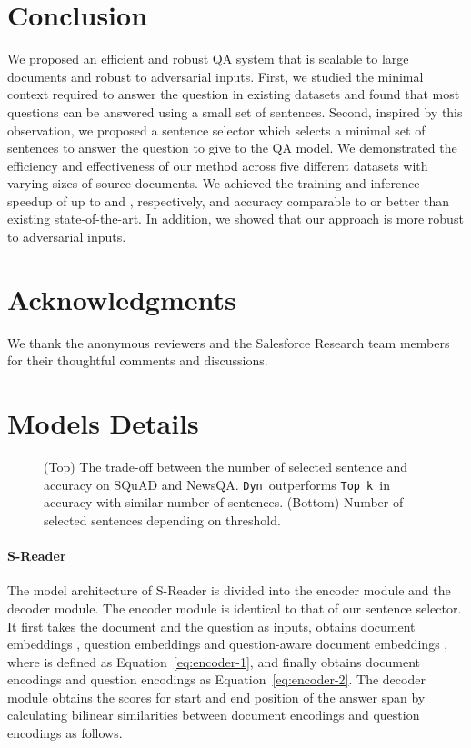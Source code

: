 \documentclass[11pt,a4paper]{article}
\newcommand{\topk}{{\tt Top k}}
\newcommand{\dyn}{{\tt Dyn}}
\begin{document}
 \section{Conclusion}\label{sec:concl}We proposed an efficient and robust QA system that is scalable to large documents and robust to adversarial inputs.
First, we studied the minimal context required to answer the question in existing datasets and found that most questions can be answered using a small set of sentences.
Second, inspired by this observation, we proposed a sentence selector which selects a minimal set of sentences to answer the question to give to the QA model.
We demonstrated the efficiency and effectiveness of our method across five different datasets with varying sizes of source documents.
We achieved the training and inference speedup of up to  and , respectively, and accuracy comparable to or better than existing state-of-the-art.
In addition, we showed that our approach is more robust to adversarial inputs. 
\section*{Acknowledgments}
We thank the anonymous reviewers and the Salesforce Research team members for their thoughtful comments and discussions.




\clearpage

\appendix
\section{Models Details}\label{sec:app-details}\begin{figure*}[pht]
\centering
{}
\caption{
(Top) The trade-off between the number of selected sentence and accuracy on SQuAD and NewsQA. \dyn~outperforms \topk~in accuracy with similar number of sentences. (Bottom) Number of selected sentences depending on threshold.
}
\label{fig:thresholding}
\end{figure*}

\paragraph{S-Reader}
The model architecture of S-Reader is divided into the encoder module and the decoder module. The encoder module is identical to that of our sentence selector. It first takes the document and the question as inputs, obtains document embeddings , question embeddings  and question-aware document embeddings , where  is defined as Equation~\ref{eq:encoder-1}, and finally obtains document encodings  and question encodings  as Equation~\ref{eq:encoder-2}.
The decoder module obtains the scores for start and end position of the answer span by calculating bilinear similarities between document encodings and question encodings as follows.
\end{document}
